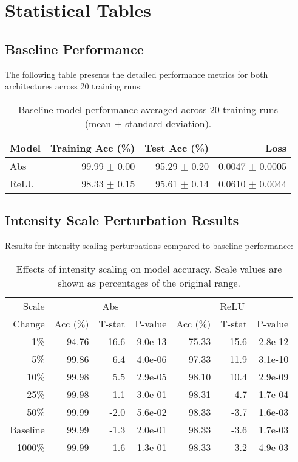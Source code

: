 \section{Statistical Tables}

\subsection{Baseline Performance}

The following table presents the detailed performance metrics for both architectures across 20 training runs:

\begin{table}[H]
\centering
\begin{tabular}{lrrr}
\hline
Model & Training Acc (\%) & Test Acc (\%) & Loss \\
\hline
Abs & 99.99 $\pm$ 0.00 & 95.29 $\pm$ 0.20 & 0.0047 $\pm$ 0.0005 \\
ReLU & 98.33 $\pm$ 0.15 & 95.61 $\pm$ 0.14 & 0.0610 $\pm$ 0.0044 \\
\hline
\end{tabular}
\caption{Baseline model performance averaged across 20 training runs (mean $\pm$ standard deviation).}
\label{tab:stat_baseline}
\end{table}

\subsection{Intensity Scale Perturbation Results}

Results for intensity scaling perturbations compared to baseline performance:

\begin{table}[H]
\centering
\begin{tabular}{r|rrr|rrr}
Scale & \multicolumn{3}{|c|}{Abs} & \multicolumn{3}{|c}{ReLU} \\
Change & Acc (\%) & T-stat & P-value & Acc (\%) & T-stat & P-value \\
\hline
1\% & 94.76 & 16.6 & 9.0e-13 & 75.33 & 15.6 & 2.8e-12 \\
5\% & 99.86 & 6.4 & 4.0e-06 & 97.33 & 11.9 & 3.1e-10 \\
10\% & 99.98 & 5.5 & 2.9e-05 & 98.10 & 10.4 & 2.9e-09 \\
25\% & 99.98 & 1.1 & 3.0e-01 & 98.31 & 4.7 & 1.7e-04 \\
50\% & 99.99 & -2.0 & 5.6e-02 & 98.33 & -3.7 & 1.6e-03 \\
Baseline & 99.99 & -1.3 & 2.0e-01 & 98.33 & -3.6 & 1.7e-03 \\
1000\% & 99.99 & -1.6 & 1.3e-01 & 98.33 & -3.2 & 4.9e-03 \\
\end{tabular}
\caption{Effects of intensity scaling on model accuracy. Scale values are shown as percentages of the original range.}
\label{tab:stat_scale}
\end{table}

